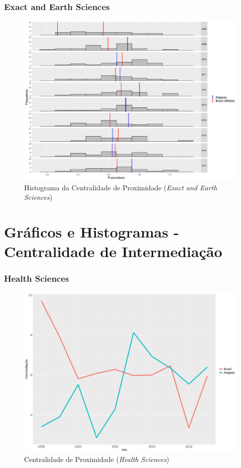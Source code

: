 \subsubsection{Exact and Earth Sciences}

\begin{figure}[H]
	\centering
	\includegraphics[scale=0.6]{Imagens/exact/closeness-hist.pdf}
	\caption{Histograma da Centralidade de Proximidade (\textit{Exact and Earth Sciences})}
	\label{hist-exact-close}
\end{figure}

\section{\textbf{Gráficos e Histogramas - Centralidade de Intermediação}}

\subsubsection{Health Sciences}

\begin{figure}[H]
	\centering
	\includegraphics[scale=0.6]{Imagens/graf-linha-betweeness-br-al.pdf}
	\caption{Centralidade de Proximidade (\textit{Health Sciences})}
	\label{between-health}
\end{figure}


